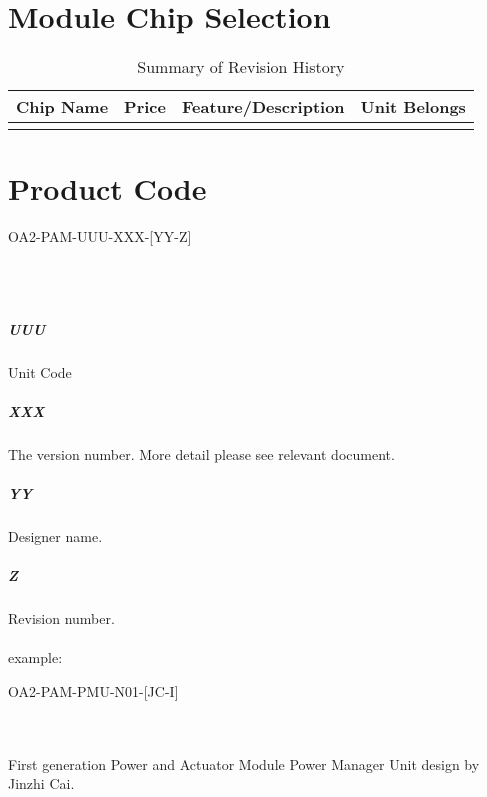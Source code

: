 \documentclass[12pt,article]{memoir}
\begin{document}
\section{Module Chip Selection}
\begin{table}[H]
	\centering
	\begin{tabu}{ c | c | c | c }
		Chip Name & Price & Feature/Description & Unit Belongs\\ \hline
		 & & & \\
	\end{tabu}
	\caption{Summary of Revision History}
	\label{tab:slc}
\end{table}
\section{Product Code}
\begin{LARGE}
OA2-PAM-UUU-XXX-[YY-Z]
\end{LARGE}\\\\
\subparagraph{UUU}
Unit Code
\subparagraph{XXX}
The version number. More detail please see relevant document.
\subparagraph{YY}
Designer name.
\subparagraph{Z}
Revision number.\\\\
example: 
\begin{large}
OA2-PAM-PMU-N01-[JC-I]
\end{large}\\\\
First generation Power and Actuator Module Power Manager Unit design by Jinzhi Cai.
\newpage

\end{document}
